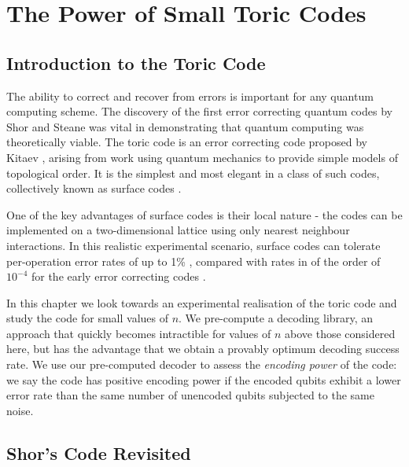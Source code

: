 \chapter{The Power of Small Toric Codes} 
\label{ch:SurfaceCodes}

\section{Introduction to the Toric Code}

The ability to correct and recover from errors is important for any quantum computing scheme. The discovery of the first error correcting quantum codes by Shor and Steane was vital in demonstrating that quantum computing was theoretically viable. The toric code is an error correcting code proposed by Kitaev \cite{kitaev_1, kitaev_2}, arising from work using quantum mechanics to provide simple models of topological order. It is the simplest and most elegant in a class of such codes, collectively known as surface codes \cite{kitaev_bravyi, planar_codes_freedman_meyer}.

One of the key advantages of surface codes is their local nature - the codes can be implemented on a two-dimensional lattice using only nearest neighbour interactions. In this realistic experimental scenario, surface codes can tolerate per-operation error rates of up to 1\% \cite{fowler_11, fowler_classical_processing}, compared with rates in of the order of $10^{-4}$ for the early error correcting codes \cite{steane_code_shit}.

In this chapter we look towards an experimental realisation of the toric code and study the code for small values of $n$. We pre-compute a decoding library, an approach that quickly becomes intractible for values of $n$ above those considered here, but has the advantage that we obtain a provably optimum decoding success rate. We use our pre-computed decoder to assess the \textit{encoding power} of the code: we say the code has positive encoding power if the encoded qubits exhibit a lower error rate than the same number of unencoded qubits subjected to the same noise.

\section{Shor's Code Revisited}

